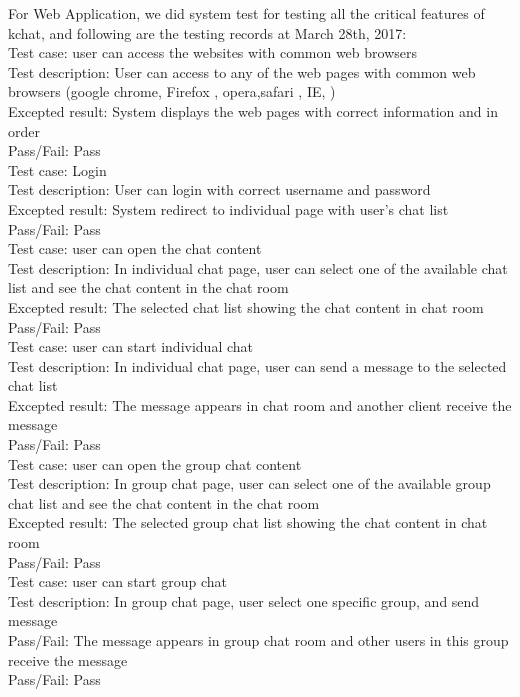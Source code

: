 \documentclass{article}
\begin{document}
\begin{enumerate}
	For Web Application, we did system test for testing all the critical features of kchat, and following are the testing records at March 28th, 2017: \\
	
	Test case: user can access the websites with common web browsers  \\
	Test description: User can access to any of the web pages with common web browsers (google chrome, Firefox , opera,safari , IE, ) \\
	Excepted result: System displays the web pages with correct information and in order \\ 
	Pass/Fail: Pass \\
	
	Test case: Login \\
	Test description: User can login with correct username and password \\
	Excepted result: System redirect to individual page with user’s chat list \\
	Pass/Fail: Pass \\
	
	Test case: user can open the chat content \\
	Test description: In individual chat page, user can select one of the available chat list and see the chat content in the chat room \\
	Excepted result: The selected chat list showing the chat content in chat room \\
	Pass/Fail: Pass \\
	
	Test case: user can start individual chat \\
	Test description: In individual chat page, user can send a message to the selected chat list \\
	Excepted result: The message appears in chat room and another client receive the message \\
	Pass/Fail: Pass \\
	
	Test case: user can open the group chat content \\
	Test description: In group chat page, user can select one of the available group chat list and see the chat content in the chat room \\
	Excepted result: The selected group chat list showing the chat content in chat room \\ 
	Pass/Fail: Pass \\
	
	Test case: user can start group chat \\ 
	Test description: In group chat page, user select one specific group, and send message \\
	Pass/Fail: The message appears in group chat room and other users in this group receive the message \\ 
	Pass/Fail: Pass \\
	

\end{enumerate}
\end{document}
